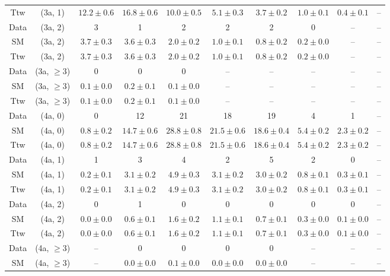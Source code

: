 \begin{table}[h!]
{\begin{tabular}{cccccccccc}
	Ttw & (3a, 1) & $12.2\pm 0.6$ & $16.8\pm 0.6$ & $10.0\pm 0.5$ & $5.1\pm 0.3$ & $3.7\pm 0.2$ & $1.0\pm 0.1$ & $0.4\pm 0.1$ & -- \\[0.5ex] 
	Data & (3a, 2) & 3 & 1 & 2 & 2 & 2 & 0 & -- & -- \\[0.5ex] 
	SM & (3a, 2) & $3.7\pm 0.3$ & $3.6\pm 0.3$ & $2.0\pm 0.2$ & $1.0\pm 0.1$ & $0.8\pm 0.2$ & $0.2\pm 0.0$ & -- & -- \\[0.5ex] 
	Ttw & (3a, 2) & $3.7\pm 0.3$ & $3.6\pm 0.3$ & $2.0\pm 0.2$ & $1.0\pm 0.1$ & $0.8\pm 0.2$ & $0.2\pm 0.0$ & -- & -- \\[0.5ex] 
	Data & (3a, $\ge3$) & 0 & 0 & 0 & -- & -- & -- & -- & -- \\[0.5ex] 
	SM & (3a, $\ge3$) & $0.1\pm 0.0$ & $0.2\pm 0.1$ & $0.1\pm 0.0$ & -- & -- & -- & -- & -- \\[0.5ex] 
	Ttw & (3a, $\ge3$) & $0.1\pm 0.0$ & $0.2\pm 0.1$ & $0.1\pm 0.0$ & -- & -- & -- & -- & -- \\[0.5ex] 
	Data & (4a, 0) & 0 & 12 & 21 & 18 & 19 & 4 & 1 & -- \\[0.5ex] 
	SM & (4a, 0) & $0.8\pm 0.2$ & $14.7\pm 0.6$ & $28.8\pm 0.8$ & $21.5\pm 0.6$ & $18.6\pm 0.4$ & $5.4\pm 0.2$ & $2.3\pm 0.2$ & -- \\[0.5ex] 
	Ttw & (4a, 0) & $0.8\pm 0.2$ & $14.7\pm 0.6$ & $28.8\pm 0.8$ & $21.5\pm 0.6$ & $18.6\pm 0.4$ & $5.4\pm 0.2$ & $2.3\pm 0.2$ & -- \\[0.5ex] 
	Data & (4a, 1) & 1 & 3 & 4 & 2 & 5 & 2 & 0 & -- \\[0.5ex] 
	SM & (4a, 1) & $0.2\pm 0.1$ & $3.1\pm 0.2$ & $4.9\pm 0.3$ & $3.1\pm 0.2$ & $3.0\pm 0.2$ & $0.8\pm 0.1$ & $0.3\pm 0.1$ & -- \\[0.5ex] 
	Ttw & (4a, 1) & $0.2\pm 0.1$ & $3.1\pm 0.2$ & $4.9\pm 0.3$ & $3.1\pm 0.2$ & $3.0\pm 0.2$ & $0.8\pm 0.1$ & $0.3\pm 0.1$ & -- \\[0.5ex] 
	Data & (4a, 2) & 0 & 1 & 0 & 0 & 0 & 0 & 0 & -- \\[0.5ex] 
	SM & (4a, 2) & $0.0\pm 0.0$ & $0.6\pm 0.1$ & $1.6\pm 0.2$ & $1.1\pm 0.1$ & $0.7\pm 0.1$ & $0.3\pm 0.0$ & $0.1\pm 0.0$ & -- \\[0.5ex] 
	Ttw & (4a, 2) & $0.0\pm 0.0$ & $0.6\pm 0.1$ & $1.6\pm 0.2$ & $1.1\pm 0.1$ & $0.7\pm 0.1$ & $0.3\pm 0.0$ & $0.1\pm 0.0$ & -- \\[0.5ex] 
	Data & (4a, $\ge3$) & -- & 0 & 0 & 0 & 0 & -- & -- & -- \\[0.5ex] 
	SM & (4a, $\ge3$) & -- & $0.0\pm 0.0$ & $0.1\pm 0.0$ & $0.0\pm 0.0$ & $0.0\pm 0.0$ & -- & -- & -- \\[0.5ex] 

\end{tabular}}
\end{table}

